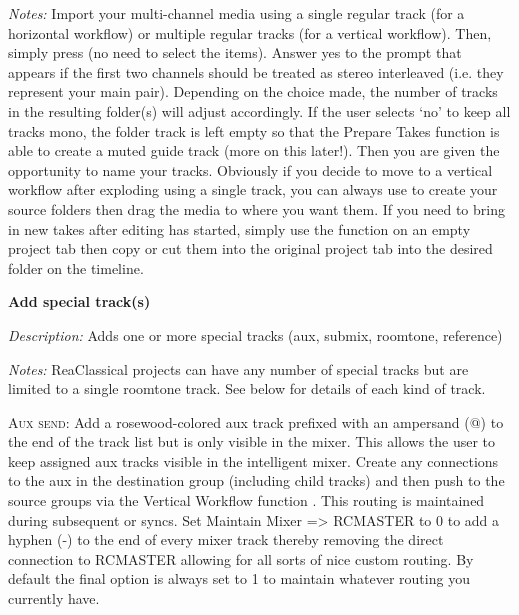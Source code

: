 \documentclass[10pt,american]{article}
\begin{document}
\emph{Notes:} Import your multi-channel media using a single regular track (for
a horizontal workflow) or multiple regular tracks (for a vertical workflow).
Then, simply press  (no need to select the items). Answer yes to the
prompt that appears if the first two channels should be treated as stereo
interleaved (i.e. they represent your main pair). Depending on the choice made,
the number of tracks in the resulting folder(s) will adjust accordingly. If the
user selects \textquoteleft no\textquoteright{} to keep all tracks mono, the
folder track is left empty so that the Prepare Takes  function is able
to create a muted guide track (more on this later!). Then you are given the
opportunity to name your tracks. Obviously if you decide to move to a vertical
workflow after exploding using a single track, you can always use  to
create your source folders then drag the media to where you want them. If you
need to bring in new takes after editing has started, simply use the function on
an empty project tab then copy or cut them into the original project tab into
the desired folder on the timeline.

\textbf{Add special track(s) }\keys{\#}

\emph{Description: }Adds one or more special tracks (aux, submix, roomtone,
reference)

\emph{Notes: }ReaClassical projects can have any number of special tracks but
are limited to a single roomtone track. See below for details of each kind of
track.

\textsc{Aux send}: Add a rosewood-colored aux track prefixed with an ampersand
(@) to the end of the track list but is only visible in the mixer. This allows
the user to keep assigned aux tracks visible in the intelligent mixer. Create
any connections to the aux in the destination group (including child tracks) and
then push to the source groups via the Vertical Workflow function  .
This routing is maintained during subsequent  or  syncs. Set
\textquotedbl Maintain Mixer => RCMASTER\textquotedbl{} to 0 to add a hyphen (-)
to the end of every mixer track thereby removing the direct connection to
RCMASTER allowing for all sorts of nice custom routing. By default the final
option is always set to 1 to maintain whatever routing you currently have.
\end{document}
